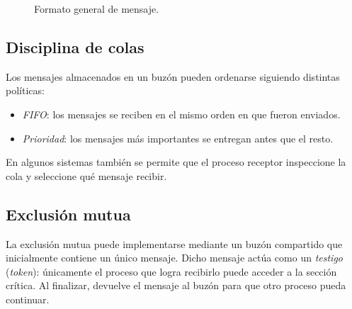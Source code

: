 \begin{figure}[!ht]
  \centering
  \caption{Formato general de mensaje.}
\end{figure}

\subsection{Disciplina de colas}

Los mensajes almacenados en un buzón pueden ordenarse siguiendo distintas políticas:
\begin{itemize}
  \item \textit{FIFO}: los mensajes se reciben en el mismo orden en que fueron enviados.
  \item \textit{Prioridad}: los mensajes más importantes se entregan antes que el resto.
\end{itemize}
En algunos sistemas también se permite que el proceso receptor inspeccione la cola y seleccione qué mensaje recibir.

\subsection{Exclusión mutua}

La exclusión mutua puede implementarse mediante un buzón compartido que inicialmente contiene un único mensaje. Dicho mensaje actúa como un \textit{testigo} (\textit{token}): únicamente el proceso que logra recibirlo puede acceder a la sección crítica. Al finalizar, devuelve el mensaje al buzón para que otro proceso pueda continuar.

